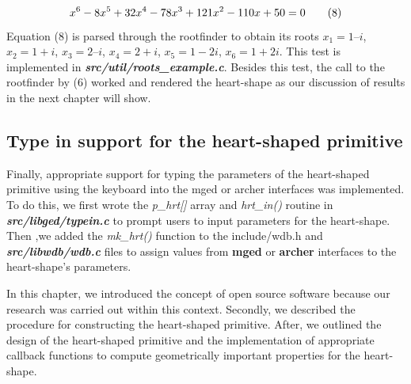 \begin{equation*}
\centering
 x^6 -­ 8x^5 + 32x^4 - 78x^3 + 121x^2 - ­110x + 50 = 0­­­­­ \tag{8}  
\end{equation*}
Equation (8) is parsed through the   root­finder   to   obtain   its   roots   $x_1 = 1 – i$, $x_2 = 1 + i$, $x_3 = 2 – i$, $x_4 = 2 +
i$, $x_5 = 1­ - 2i$, $x_6 = 1 + 2i$. This   test   is   implemented   in   \textit{\textbf{src/util/roots\_example.c}}.  
Besides   this   test,   the   call   to   the   root­finder   by   (6)   worked   and   rendered   the  
heart-shape as our discussion of results in the next chapter will show.  

\subsection{Type in support for the heart-­shaped primitive}

Finally,   appropriate   support   for   typing   the   parameters   of   the   heart­-shaped  
primitive   using   the   keyboard   into   the   mged   or   archer   interfaces   was  
implemented.   To   do   this,   we   first   wrote   the   \textit{p\_hrt[]}   array   and   \textit{hrt\_in()}   routine   in  
\textit{\textbf{src/libged/typein.c}}   to   prompt   users   to   input   parameters   for   the   heart­-shape.  
Then ,we   added   the   \textit{mk\_hrt()}   function   to   the   include/wdb.h   and  \textit{\textbf{src/libwdb/wdb.c}} files   to   assign   values   from   \textbf{mged}   or   \textbf{archer}   interfaces   to   the  heart-shape's parameters.


\hspace{30} In   this   chapter,   we   introduced   the   concept   of   open   source   software  
because   our   research   was   carried   out   within   this   context.   Secondly,   we   described  
the   procedure   for   constructing   the   heart­-shaped   primitive. After, we   outlined   the  
design   of   the   heart­-shaped   primitive   and   the   implementation   of   appropriate  
callback   functions   to   compute   geometrically   important   properties   for   the  
heart­-shape.  
